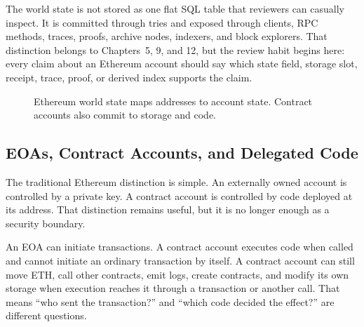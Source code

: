 The world state is not stored as one flat SQL table that reviewers can casually inspect. It is committed through tries and exposed through clients, RPC methods, traces, proofs, archive nodes, indexers, and block explorers. That distinction belongs to Chapters~5, 9, and 12, but the review habit begins here: every claim about an Ethereum account should say which state field, storage slot, receipt, trace, proof, or derived index supports the claim.

\begin{figure}[htbp]
\centering
{}
\caption{Ethereum world state maps addresses to account state. Contract accounts also commit to storage and code.}
\end{figure}

\subsection{EOAs, Contract Accounts, and Delegated Code}

The traditional Ethereum distinction is simple. An externally owned account is controlled by a private key. A contract account is controlled by code deployed at its address. That distinction remains useful, but it is no longer enough as a security boundary.

An EOA can initiate transactions. A contract account executes code when called and cannot initiate an ordinary transaction by itself. A contract account can still move ETH, call other contracts, emit logs, create contracts, and modify its own storage when execution reaches it through a transaction or another call. That means ``who sent the transaction?'' and ``which code decided the effect?'' are different questions.

